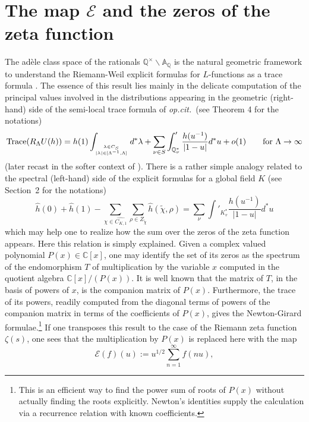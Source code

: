 \documentclass{pspum-l}
\theoremstyle{definition}
\theoremstyle{remark}
\numberwithin{equation}{section}
\newcommand{\opcit}{{\it op.cit.\/}\ }
\def\A{{\mathbb A}}
\def\C{{\mathbb C}}
\def\Q{{\mathbb Q}}
\def\cE{{\mathcal E}}
\begin{document}
 \section{The map $\cE$ and the zeros of the zeta function}\label{sectE}
  The ad\`ele class space of the rationals $\Q^\times\backslash \A_\Q$  is the natural geometric framework to understand the Riemann-Weil explicit formulas for $L$-functions as a trace formula \cite{Co-zeta}. The essence of this result lies mainly in the delicate computation of the  principal values involved in the distributions appearing in the  geometric (right-hand) side of the semi-local trace formula of \opcit (see Theorem 4 for the notations)
  \[
  \text{Trace}(R_\Lambda U(h))=h(1)\int_{\lambda\in C_S\atop |\lambda|\in[\Lambda^{-1},\Lambda]}d^*\lambda+\sum_{\nu\in S}\int'_{\Q_\nu^*}\frac{h(u^{-1})}{|1-u|}d^*u+o(1)\qquad \text{for $\Lambda\to\infty$}
  \]
  (later recast in the softer context of \cite{Meyer}). There is a rather simple analogy related to the spectral (left-hand) side of the explicit  formulas for a global field $K$ (see \cite{CRH} Section~2 for the notations)
  \[
  \hat h(0)+\hat h(1) - \sum_{\chi\in \widehat{C_{K,1}}}\sum_{\rho\in Z_{\tilde\chi}}\hat h(\tilde\chi,\rho) = \sum_\nu\int'_{K_v^*}\frac{h(u^{-1})}{|1-u|}d^*u
  \]
  which may help one to realize how the sum over the zeros of the zeta function appears. Here this relation is simply explained.
  Given a complex valued polynomial $P(x)\in \C[x]$, one may identify the set of its zeros  as the spectrum of the endomorphism $T$ of multiplication by the variable $x$ computed in the quotient algebra $\C[x]/(P(x))$. It is well known that the matrix of $T$, in the basis of powers of $x$, is the companion matrix of $P(x)$. Furthermore, the trace of its powers, readily computed from the diagonal terms of powers of the companion matrix in terms of the coefficients of $P(x)$, gives the Newton-Girard formulae.\footnote{This is an efficient way to find the power sum of roots of $P(x)$ without actually finding the roots explicitly.  Newton's identities supply the calculation via a recurrence relation with known coefficients.}
 If one transposes this result to the case of the Riemann zeta function $\zeta(s)$, one sees that the multiplication by $P(x)$ is replaced here with the  map 
 \begin{equation}\label{mapE}
 \cE(f)(u):=u^{1/2}\sum_{n=1}^\infty f(nu),
 \end{equation} 
\end{document}
